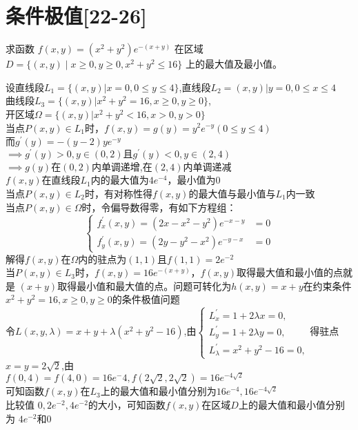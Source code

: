 \section*{条件极值[22-26]}
\begin{question}
    求函数 \(f(x,y) = (x^{2} + y^{2})e^{-(x+y)}\) 在区域 \(D = \{(x,y) \mid x \geqslant 0, y \geqslant 0, x^{2} + y^{2} \leqslant 16\}\) 上的最大值及最小值。
\end{question}
\begin{solution}
    设直线段\(L_1 = \{(x,y)|x = 0,0\leq y \leq 4\}\),直线段\(L_2={(x,y)|y=0,0\leq x\leq 4}\)\\
    曲线段\(L_3 = \{(x,y)|x^2+y^2=16,x\geq 0,y\geq 0\}\),\\
    开区域\(\Omega = {\{(x,y)|x^2+y^2<16,x>0,y>0\}}\)\\
    当点\(P(x,y) \in L_1\)时，\(f(x,y) =g(y)= y^2e^{-y} (0\leq y \leq 4)\)\\
    而\(g^\prime(y) = - (y-2)ye^{-y} \)\\
    \(\implies g^\prime(y)>0,y\in(0,2)\text{且}g^\prime(y)<0,y\in(2,4)\)\\
    \(\implies g(y)\text{在}(0,2)\text{内}\)单调递增,在\((2,4)\)内单调递减\\
    \(f(x,y)\)在直线段\(L_1\)内的最大值为\(4e^{-4}\)，最小值为\(0\)\\
    当点\(P(x,y) \in L_2\)时，有对称性得\(f(x,y)\)的最大值与最小值与\(L_1\)内一致\\
    当点\(P(x,y) \in \Omega\)时，令偏导数得零，有如下方程组：
    \begin{equation}
        \begin{cases}
            f_{x}^{\prime}(x,y) = (2x -x^2 -y^2) e^{-x-y}&= 0\\
            f_{y}^{\prime}(x,y) = (2y - y^2 -x^2)e^{-y-x}&=0
        \end{cases}
    \end{equation}
    解得\(f(x,y)\)在\(\Omega\)内的驻点为\((1,1) \text{且}f(1,1) = 2e^{-2}\)\\
    当\(P(x,y) \in L_3\)时，\(f(x,y) = 16e^{-(x+y)}\)，\(f(x,y)\)取得最大值和最小值的点就是
    \((x+y)\)取得最小值和最大值的点。问题可转化为\(h(x,y) = x+y\)在约束条件\(x^2+y^2=16,x\geq0,y\geq0\)的条件极值问题\\
    令\(L(x,y,\lambda) = x+y+\lambda(x^2+y^2-16)\),由\(\begin{cases}
        L_{x}^{\prime} = 1+2\lambda x =0,\\
        L_{y}^{\prime} = 1 +2\lambda y=0,\\
        L_{\lambda}^{\prime} = x^2 +y^2 -16 =0,
    \end{cases}\)得驻点\(x=y=2\sqrt{2}\),由\\
    \(f(0,4) = f(4,0)=16e^-4,f(2\sqrt{2},2\sqrt{2}) = 16e^{-4\sqrt{2}}\)\\
    可知函数\(f(x,y)\)在\(L_3\)上的最大值和最小值分别为\(16e^{-4},16e^{-4\sqrt{2}}\)\\
    比较值 \(0,2e^{-2},4e^{-2}\)的大小，可知函数\(f(x,y)\)在区域\(D\)上的最大值和最小值分别为
    \(4e^{-2}\text{和}0\)
\end{solution}



